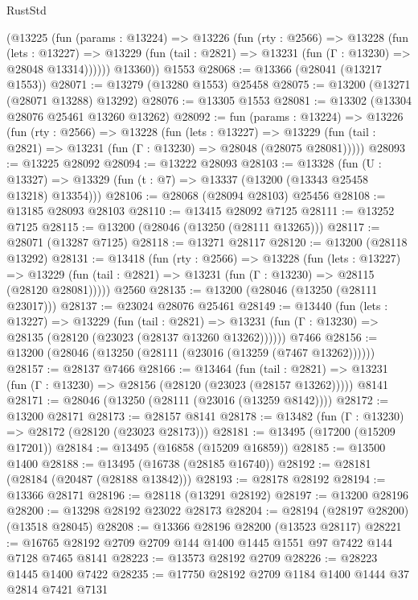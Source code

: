 \begin{lexlean}{RustStd}
\begin{coremodule}
        (@13225
          (fun (params : @13224) =>
          @13226
            (fun (rty : @2566) =>
            @13228
              (fun (lets : @13227) =>
              @13229 (fun (tail : @2821) => @13231 (fun (Γ : @13230) => @28048 @13314))))))
        @13360))
    @1553
@28068 := @13366 (@28041 (@13217 @1553))
@28071 := @13279 (@13280 @1553) @25458
@28075 := @13200 (@13271 (@28071 @13288) @13292)
@28076 := @13305 @1553
@28081 := @13302 (@13304 @28076 @25461 @13260 @13262)
@28092 := fun (params : @13224) =>
  @13226
    (fun (rty : @2566) =>
    @13228
      (fun (lets : @13227) =>
      @13229 (fun (tail : @2821) => @13231 (fun (Γ : @13230) => @28048 (@28075 @28081)))))
@28093 := @13225 @28092
@28094 := @13222 @28093
@28103 := @13328
    (fun (U : @13327) => @13329 (fun (t : @7) => @13337 (@13200 (@13343 @25458 @13218) @13354)))
@28106 := @28068 (@28094 @28103) @25456
@28108 := @13185 @28093 @28103
@28110 := @13415 @28092 @7125
@28111 := @13252 @7125
@28115 := @13200 (@28046 (@13250 (@28111 @13265)))
@28117 := @28071 (@13287 @7125)
@28118 := @13271 @28117
@28120 := @13200 (@28118 @13292)
@28131 := @13418
    (fun (rty : @2566) =>
    @13228
      (fun (lets : @13227) =>
      @13229 (fun (tail : @2821) => @13231 (fun (Γ : @13230) => @28115 (@28120 @28081)))))
    @2560
@28135 := @13200 (@28046 (@13250 (@28111 @23017)))
@28137 := @23024 @28076 @25461
@28149 := @13440
    (fun (lets : @13227) =>
    @13229
      (fun (tail : @2821) =>
      @13231 (fun (Γ : @13230) => @28135 (@28120 (@23023 (@28137 @13260 @13262))))))
    @7466
@28156 := @13200 (@28046 (@13250 (@28111 (@23016 (@13259 (@7467 @13262))))))
@28157 := @28137 @7466
@28166 := @13464
    (fun (tail : @2821) => @13231 (fun (Γ : @13230) => @28156 (@28120 (@23023 (@28157 @13262)))))
    @8141
@28171 := @28046 (@13250 (@28111 (@23016 (@13259 @8142))))
@28172 := @13200 @28171
@28173 := @28157 @8141
@28178 := @13482 (fun (Γ : @13230) => @28172 (@28120 (@23023 @28173)))
@28181 := @13495 (@17200 (@15209 @17201))
@28184 := @13495 (@16858 (@15209 @16859))
@28185 := @13500 @1400
@28188 := @13495 (@16738 (@28185 @16740))
@28192 := @28181 (@28184 (@20487 (@28188 @13842)))
@28193 := @28178 @28192
@28194 := @13366 @28171
@28196 := @28118 (@13291 @28192)
@28197 := @13200 @28196
@28200 := @13298 @28192 @23022 @28173
@28204 := @28194 (@28197 @28200) (@13518 @28045)
@28208 := @13366 @28196 @28200 (@13523 @28117)
@28221 := @16765 @28192 @2709 @2709 @144 @1400 @1445 @1551 @97 @7422 @144 @7128 @7465 @8141
@28223 := @13573 @28192 @2709
@28226 := @28223 @1445 @1400 @7422
@28235 := @17750 @28192 @2709 @1184 @1400 @1444 @37 @2814 @7421 @7131

\end{coremodule}
\end{lexlean}
